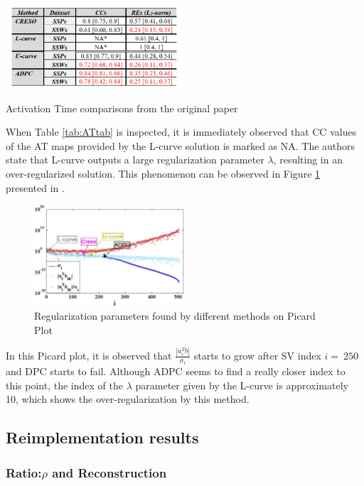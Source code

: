 \documentclass[draftcls, onecolumn, journal]{IEEEtran}
\begin{document}
\begin{table}[h]
    \centering
    \includegraphics[width=0.5\textwidth, height = 0.2\textwidth]{../images/ATTable.png}
    \caption{\label{tab:ATtab}Activation Time comparisons from the original paper}
\end{table}

When Table \ref{tab:ATtab} is inspected, it is immediately observed that CC values of the AT maps provided by the L-curve solution is marked as NA. The authors state that L-curve outputs a large regularization parameter $\lambda$, resulting in an over-regularized solution. This phenomenon can be observed in Figure \ref{fig:versus} presented in \cite*{chamorro2017improving}.

\begin{figure}[h]
\centering
\includegraphics[width=0.5\textwidth]{../images/Versus.png}
\caption{Regularization parameters found by different methods on Picard Plot}\label{fig:versus}
\end{figure}

In this Picard plot, it is observed that $\frac{|u_i^Tb|}{\sigma_i}$ starts to grow after SV index $i=~250$ and DPC starts to fail. Although ADPC seems to find a really closer index to this point, the index of the $\lambda$ parameter given by the L-curve is approximately 10, which shows the over-regularization by this method. 

\subsection{Reimplementation results}

\subsubsection*{Ratio:$\rho$ and Reconstruction} \label{subsec:ratiorho}
\end{document}

